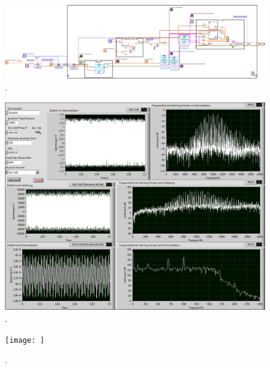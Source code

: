 \documentclass[
a4paper,
12pt,
pagesize,
ngerman
]{scrartcl}
\begin{document}
	\begin{figure}[h]
		\centering
		\includegraphics[width=1.0\textwidth]{EIRE2018Dateien/Tag4/OsziFMPM-Demod/FM/OsziPlusFMPMd}
		\caption{.}
	\end{figure}

	\begin{figure}[h]
		\centering
		\includegraphics[width=1.0\textwidth]{EIRE2018Dateien/Tag4/OsziFMPM-Demod/FM/OsziPlusFMPMp}
		\caption{.}
	\end{figure}

	\begin{figure}[h] %
		\centering
		\texttt{[image: ]}
		\caption{.}
	\end{figure}
\end{document}
